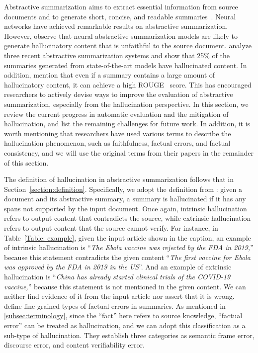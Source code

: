 \label{section:summarization}
Abstractive summarization aims to extract essential information from source documents and to generate short, concise, and readable summaries~. Neural networks have achieved remarkable results on abstractive summarization. However,  observe that neural abstractive summarization models are likely to generate hallucinatory content that is unfaithful to the source document.  analyze three recent abstractive summarization systems and show that 25\% of the summaries generated from state-of-the-art models have hallucinated content. In addition,  mention that even if a summary contains a large amount of hallucinatory content, it can achieve a high ROUGE~ score. This has encouraged researchers to actively devise ways to improve the evaluation of abstractive summarization, especially from the hallucination perspective.
In this section, we review the current progress in automatic evaluation and the mitigation of hallucination, and list the remaining challenges for future work. In addition, it is worth mentioning that researchers have used various terms to describe the hallucination phenomenon, such as faithfulness, factual errors, and factual consistency, and we will use the original terms from their papers in the remainder of this section.

The definition of hallucination in abstractive summarization follows that in Section~\ref{section:definition}. Specifically, we adopt the definition from : given a document and its abstractive summary, a summary is hallucinated if it has any spans not supported by the input document. 
Once again, intrinsic hallucination refers to output content that contradicts the source, while extrinsic hallucination refers to output content that the source cannot verify.
For instance, in Table~\ref{Table: example}, given the input article shown in the caption,
an example of intrinsic hallucination is ``\textit{The Ebola vaccine was rejected by the FDA in 2019,}'' because this statement contradicts the given content ``\textit{The first vaccine for Ebola was approved by the FDA in 2019 in the US}''.
And an example of extrinsic hallucination is ``\textit{China has already started clinical trials of the COVID-19 vaccine,}'' because this statement is not mentioned in the given content. We can neither find evidence of it from the input article nor assert that it is wrong.
 define fine-grained types of factual errors in summaries. 
As mentioned in \ref{subsec:terminology}, since the ``fact'' here refers to source knowledge, ``factual error'' can be treated as hallucination, and we can adopt this classification as a sub-type of hallucination.
They establish three categories as semantic frame error, discourse error, and content verifiability error.

